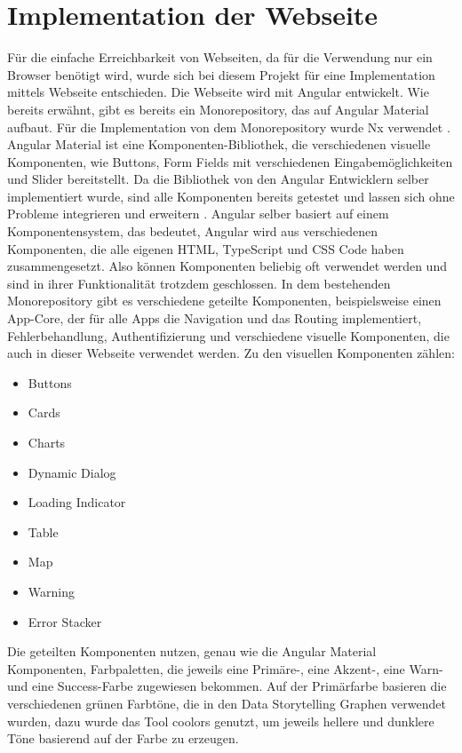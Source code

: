 \chapter{Implementation der Webseite}
Für die einfache Erreichbarkeit von Webseiten, da für die Verwendung nur ein Browser benötigt wird, wurde sich bei diesem Projekt für eine Implementation mittels Webseite entschieden. Die Webseite wird mit Angular entwickelt. Wie bereits erwähnt, gibt es bereits ein Monorepository, das auf Angular Material aufbaut. Für die Implementation von dem Monorepository wurde Nx verwendet \cite{Nx.}.  Angular Material ist eine Komponenten-Bibliothek, die verschiedenen visuelle Komponenten, wie Buttons, Form Fields mit verschiedenen Eingabemöglichkeiten und Slider bereitstellt. Da die Bibliothek von den Angular Entwicklern selber implementiert wurde, sind alle Komponenten bereits getestet und lassen sich ohne Probleme integrieren und erweitern \cite{Angular.2024}. Angular selber basiert auf einem Komponentensystem, das bedeutet, Angular wird aus verschiedenen Komponenten, die alle eigenen HTML, TypeScript und CSS Code haben zusammengesetzt. Also können Komponenten beliebig oft verwendet werden und sind in ihrer Funktionalität trotzdem geschlossen. In dem bestehenden Monorepository gibt es verschiedene geteilte Komponenten, beispielsweise einen App-Core, der für alle Apps die Navigation und das Routing implementiert, Fehlerbehandlung, Authentifizierung und verschiedene visuelle Komponenten, die auch in dieser Webseite verwendet werden. Zu den visuellen Komponenten zählen:
\begin{multicols}{3}
    \begin{itemize}
        \item Buttons
        \item Cards
        \item Charts 
        \item Dynamic Dialog
        \item Loading Indicator
        \item Table
        \item Map
        \item Warning
        \item Error Stacker
    \end{itemize}
\end{multicols}
\noindent
Die geteilten Komponenten nutzen, genau wie die Angular Material Komponenten, Farbpaletten, die jeweils eine Primäre-, eine Akzent-, eine Warn- und eine Success-Farbe zugewiesen bekommen. Auf der Primärfarbe basieren die verschiedenen grünen Farbtöne, die in den Data Storytelling Graphen verwendet wurden, dazu wurde das Tool coolors \cite{FabrizioBianchi.} genutzt, um jeweils hellere und dunklere Töne basierend auf der Farbe zu erzeugen.
